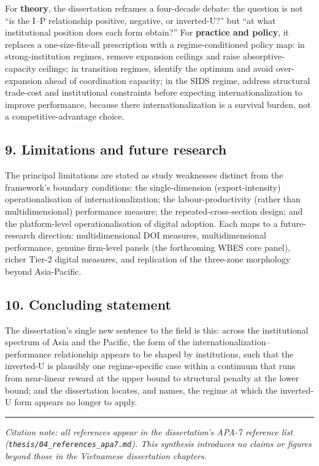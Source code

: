\documentclass[
  a4paper,
  13pt]{extreport}
\begin{document}
For \textbf{theory}, the dissertation reframes a four-decade debate: the
question is not ``is the I--P relationship positive, negative, or
inverted-U?'' but ``at what institutional position does each form
obtain?'' For \textbf{practice and policy}, it replaces a
one-size-fits-all prescription with a regime-conditioned policy map: in
strong-institution regimes, remove expansion ceilings and raise
absorptive-capacity ceilings; in transition regimes, identify the
optimum and avoid over-expansion ahead of coordination capacity; in the
SIDS regime, address structural trade-cost and institutional constraints
before expecting internationalization to improve performance, because
there internationalization is a survival burden, not a
competitive-advantage choice.

\hypertarget{limitations-and-future-research}{%
\subsection{9. Limitations and future
research}\label{limitations-and-future-research}}

The principal limitations are stated as study weaknesses distinct from
the framework's boundary conditions: the single-dimension
(export-intensity) operationalisation of internationalization; the
labour-productivity (rather than multidimensional) performance measure;
the repeated-cross-section design; and the platform-level
operationalisation of digital adoption. Each maps to a future-research
direction: multidimensional DOI measures, multidimensional performance,
genuine firm-level panels (the forthcoming WBES core panel), richer
Tier-2 digital measures, and replication of the three-zone morphology
beyond Asia-Pacific.

\hypertarget{concluding-statement}{%
\subsection{10. Concluding statement}\label{concluding-statement}}

The dissertation's single new sentence to the field is this: across the
institutional spectrum of Asia and the Pacific, the form of the
internationalization--performance relationship appears to be shaped by
institutions, such that the inverted-U is plausibly one regime-specific
case within a continuum that runs from near-linear reward at the upper
bound to structural penalty at the lower bound; and the dissertation
locates, and names, the regime at which the inverted-U form appears no
longer to apply.

\begin{center}\rule{0.5\linewidth}{0.5pt}\end{center}

\emph{Citation note: all references appear in the dissertation's APA-7
reference list (\texttt{thesis/04\_references\_apa7.md}). This synthesis
introduces no claims or figures beyond those in the Vietnamese
dissertation chapters.}
\end{document}

